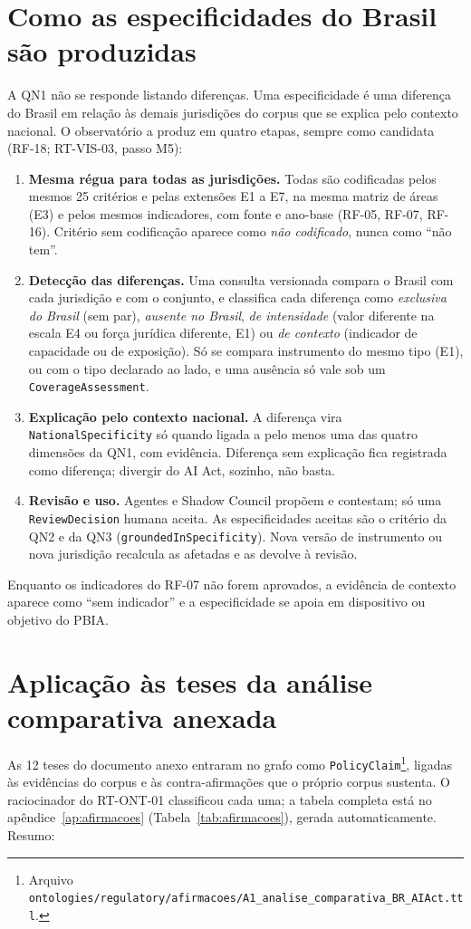 \documentclass[12pt,a4paper,oneside,english,brazil]{abntex2}
\begin{document}
\section{Como as especificidades do Brasil são produzidas}\label{sec:especificidades}
A QN1 não se responde listando diferenças. Uma especificidade é uma diferença do Brasil em relação às demais jurisdições do corpus que se explica pelo contexto nacional. O observatório a produz em quatro etapas, sempre como candidata (RF-18; RT-VIS-03, passo M5):
\begin{enumerate}[leftmargin=*]
  \item \textbf{Mesma régua para todas as jurisdições.} Todas são codificadas pelos mesmos 25 critérios e pelas extensões E1 a E7, na mesma matriz de áreas (E3) e pelos mesmos indicadores, com fonte e ano-base (RF-05, RF-07, RF-16). Critério sem codificação aparece como \emph{não codificado}, nunca como ``não tem''.
  \item \textbf{Detecção das diferenças.} Uma consulta versionada compara o Brasil com cada jurisdição e com o conjunto, e classifica cada diferença como \emph{exclusiva do Brasil} (sem par), \emph{ausente no Brasil}, \emph{de intensidade} (valor diferente na escala E4 ou força jurídica diferente, E1) ou \emph{de contexto} (indicador de capacidade ou de exposição). Só se compara instrumento do mesmo tipo (E1), ou com o tipo declarado ao lado, e uma ausência só vale sob um \texttt{CoverageAssessment}.
  \item \textbf{Explicação pelo contexto nacional.} A diferença vira \texttt{NationalSpecificity} só quando ligada a pelo menos uma das quatro dimensões da QN1, com evidência. Diferença sem explicação fica registrada como diferença; divergir do AI Act, sozinho, não basta.
  \item \textbf{Revisão e uso.} Agentes e Shadow Council propõem e contestam; só uma \texttt{ReviewDecision} humana aceita. As especificidades aceitas são o critério da QN2 e da QN3 (\texttt{groundedInSpecificity}). Nova versão de instrumento ou nova jurisdição recalcula as afetadas e as devolve à revisão.
\end{enumerate}
Enquanto os indicadores do RF-07 não forem aprovados, a evidência de contexto aparece como ``sem indicador'' e a especificidade se apoia em dispositivo ou objetivo do PBIA.

\section{Aplicação às teses da análise comparativa anexada}\label{sec:teses}
As 12 teses do documento anexo \cite{estudo-comparativo} entraram no grafo como \texttt{PolicyClaim}\footnote{Arquivo \texttt{ontologies/regulatory/afirmacoes/}\allowbreak\texttt{A1\_analise\_comparativa\_BR\_AIAct.ttl}.}, ligadas às evidências do corpus e às contra-afirmações que o próprio corpus sustenta. O raciocinador do RT-ONT-01 classificou cada uma; a tabela completa está no apêndice~\ref{ap:afirmacoes} (Tabela~\ref{tab:afirmacoes}), gerada automaticamente. Resumo:
\end{document}
